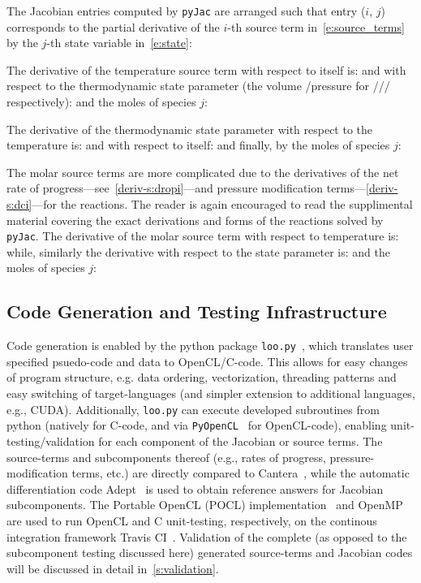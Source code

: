 \documentclass[12pt,number,sort&compress,preprint]{elsarticle}
\begin{document}
The Jacobian entries computed by \texttt{pyJac} are arranged such that entry ($i$, $j$) corresponds to the partial derivative of the $i$-th source term in~\cref{e:source_terms} by the $j$-th state variable in~\cref{e:state}:

The derivative of the temperature source term with respect to itself is:
and with respect to the thermodynamic state parameter (the volume \slash pressure for \conp/\slash\conv/ respectively):
and the moles of species $j$:

The derivative of the thermodynamic state parameter with respect to the temperature is:
and with respect to itself:
and finally, by the moles of species $j$:

The molar source terms are more complicated due to the derivatives of the net rate of progress---see~\cref{deriv-s:dropi}---and pressure modification terms---\cref{deriv-s:dci}---for the reactions.
The reader is again encouraged to read the supplimental material covering the exact derivations and forms of the reactions solved by \texttt{pyJac}.
The derivative of the molar source term with respect to temperature is:
while, similarly the derivative with respect to the state parameter is:
and the moles of species $j$:

\subsection{Code Generation and Testing Infrastructure}
Code generation is enabled by the python package \texttt{loo.py}~\cite{kloeckner_loopy_2014}, which translates user specified psuedo-code and data to OpenCL\slash C-code.
This allows for easy changes of program structure, e.g. data ordering, vectorization, threading patterns and easy switching of target-languages (and simpler extension to additional languages, e.g., CUDA).
Additionally, \texttt{loo.py} can execute developed subroutines from python (natively for C-code, and via \texttt{PyOpenCL}~\cite{kloeckner_pycuda_2012} for OpenCL-code), enabling unit-testing\slash validation for each component of the Jacobian or source terms.
The source-terms and subcomponents thereof (e.g., rates of progress, pressure-modification terms, etc.) are directly compared to Cantera~\cite{Cantera}, while the automatic differentiation code Adept~\cite{adept-v11} is used to obtain reference answers for Jacobian subcomponents.
The Portable OpenCL (POCL) implementation~\cite{poclIJPP} and OpenMP~\cite{dagum1998openmp} are used to run OpenCL and C unit-testing, respectively, on the continous integration framework Travis CI~\cite{travis:2018}.
Validation of the complete (as opposed to the subcomponent testing discussed here) generated source-terms and Jacobian codes will be discussed in detail in~\cref{s:validation}.
\end{document}
